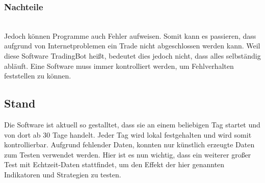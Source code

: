 \subsubsection{Nachteile\nopunct}~\\
Jedoch können Programme auch Fehler aufweisen. Somit kann es passieren, dass aufgrund von Internetproblemen ein Trade nicht abgeschlossen werden kann. Weil diese Software TradingBot heißt, bedeutet dies jedoch nicht, dass alles selbständig abläuft. Eine Software muss immer kontrolliert werden, um Fehlverhalten feststellen zu können.

\subsection{Stand}
Die Software ist aktuell so gestalltet, dass sie an einem beliebigen Tag startet und von dort ab 30 Tage handelt. Jeder Tag wird lokal festgehalten und wird somit kontrollierbar. Aufgrund fehlender Daten, konnten nur künstlich erzeugte Daten zum Testen verwendet werden. Hier ist es nun wichtig, dass ein weiterer großer Test mit Echtzeit-Daten stattfindet, um den Effekt der hier genannten Indikatoren und Strategien zu testen. 
